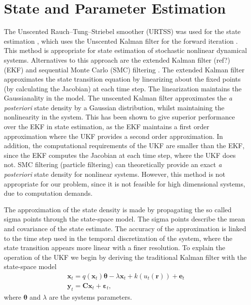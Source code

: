\documentclass[onecolumn,draftcls]{IEEEtran}
\begin{document}
\section{State and Parameter Estimation}
The Unscented Rauch–Tung–Striebel smoother (URTSS) was used for the state estimation \cite{Sarkka2010}, which uses the Unscented Kalman filter for the forward iteration \cite{Julier1997}. This method is appropriate for state estimation of stochastic nonlinear dynamical systems. Alternatives to this approach are the extended Kalman filter (ref?) (EKF) and sequential Monte Carlo (SMC) filtering \cite{doucet2001}. The extended Kalman filter approximates the state transition equation by linearizing about the fixed points (by calculating the Jacobian) at each time step. The linearization maintains the Gaussianality in the model. The unscented Kalman filter approximates the \emph{a posteriori} state density by a Gaussian distribution, whilst maintaining the nonlinearity in the system. This has been shown to give superior performance over the EKF in state estimation, as the EKF maintains a first order approximation where the UKF provides a second order approximation. In addition, the computational requirements of the UKF are smaller than the EKF, since the EKF computes the Jacobian at each time step, where the UKF does not. SMC filtering (particle filtering) can theoretically provide an exact \emph{a posteriori} state density for nonlinear systems. However, this method is not appropriate for our problem, since it is not feasible for high dimensional systems, due to computation demands.

The approximation of the state density is made by propagating the so called sigma points through the state-space model. The sigma points describe the mean and covariance of the state estimate. The accuracy of the approximation is linked to the time step used in the temporal discretization of the system, where the state transition appears more linear with a finer resolution. To explain the operation of the UKF we begin by deriving the traditional Kalman filter with the state-space model
\begin{eqnarray}
	\mathbf{x}_t = q(\mathbf{x}_t)\boldsymbol{\theta} - \lambda\mathbf{x}_t + k\left(u_t\left(\mathbf{r}\right)\right) + \mathbf{e}_t \\
	\mathbf{y}_t = \mathbf{C}\mathbf{x}_t + \boldsymbol{\varepsilon}_t,
\end{eqnarray}
where $\boldsymbol{\theta}$ and $\lambda$ are the systems parameters. 
\end{document}
